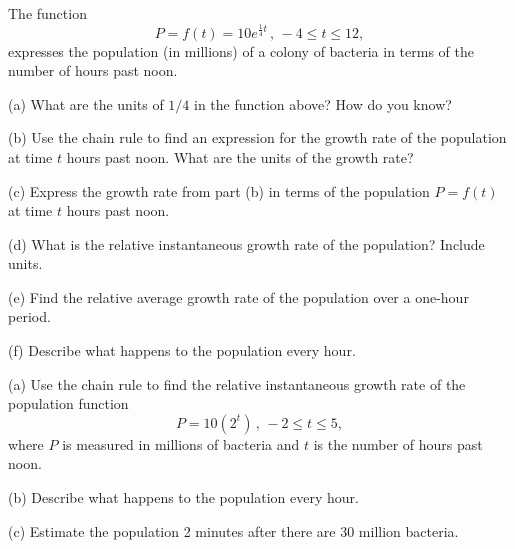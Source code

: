 \documentclass{ximera}
\begin{document}
\begin{example}  \label{Ex:Chdfr5llk}
The function 
\[
       P = f(t) = 10 e^{\frac{1}{4}t} \, , \, -4\leq t \leq 12 ,
\] 
expresses the population (in millions) of a colony of bacteria in terms of the number of hours past noon.

(a) What are the units of $1/4$ in the function above? How do you know?

(b)  Use the chain rule to find an expression for the growth rate of the population at time $t$ hours past noon. What are the units of the growth rate?

(c) Express the growth rate from part (b) in terms of the population $P=f(t)$ at time $t$ hours past noon.

(d) What is the relative instantaneous growth rate of the population? Include units.

(e) Find the relative average growth rate of the population over a one-hour period. 

(f) Describe what happens to the population every hour.

\end{example}

\begin{example}  \label{Ex:CHHODDrer}
 (a) Use the chain rule to find the relative instantaneous growth rate of the population function
\[
      P = 10 (2^t)  \, , \, -2\leq t \leq 5 ,
\]
where $P$ is measured in millions of bacteria and $t$ is the number of hours past noon.

(b) Describe what happens to the population every hour.

(c) Estimate the population 2 minutes after there are 30 million bacteria.
\end{example}
\end{document}
